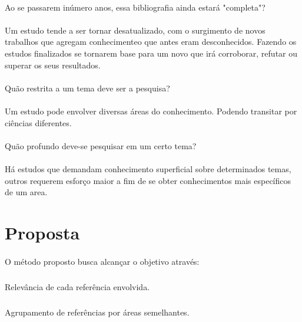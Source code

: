 \paragraph{}
Ao se passarem inúmero anos, essa bibliografia ainda estará "completa"?

\paragraph{}
Um estudo tende a ser tornar desatualizado, com o surgimento de novos trabalhos que agregam conhecimenteo que antes eram desconhecidos. Fazendo os estudos finalizados se tornarem base para um novo que irá corroborar, refutar ou superar os seus resultados.

\paragraph{}
Quão restrita a um tema deve ser a pesquisa?

\paragraph{}
Um estudo pode envolver diversas áreas do conhecimento. Podendo transitar por ciências diferentes.

\paragraph{}
Quão profundo deve-se pesquisar em um certo tema?

\paragraph{}
Há estudos que demandam conhecimento superficial sobre determinados temas, outros requerem esforço maior a fim de se obter conhecimentos mais específicos de um area.

\section{Proposta}

\paragraph{}
O método proposto busca alcançar o objetivo através:

\subparagraph{}
Relevância de cada referência envolvida.

\subparagraph{}
Agrupamento de referências por áreas semelhantes.